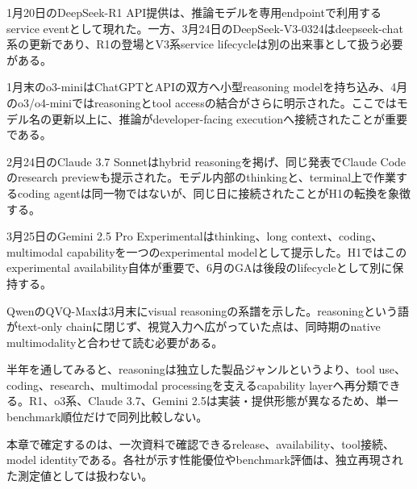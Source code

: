 
1月20日のDeepSeek-R1 API提供は、推論モデルを専用endpointで利用するservice eventとして現れた。一方、3月24日のDeepSeek-V3-0324はdeepseek-chat系の更新であり、R1の登場とV3系service lifecycleは別の出来事として扱う必要がある。\autocite{src-8f8555b73e1b}


1月末のo3-miniはChatGPTとAPIの双方へ小型reasoning modelを持ち込み、4月のo3/o4-miniではreasoningとtool accessの結合がさらに明示された。ここではモデル名の更新以上に、推論がdeveloper-facing executionへ接続されたことが重要である。\autocite{src-650b567698aa,src-bf92f3d905c3}


2月24日のClaude 3.7 Sonnetはhybrid reasoningを掲げ、同じ発表でClaude Codeのresearch previewも提示された。モデル内部のthinkingと、terminal上で作業するcoding agentは同一物ではないが、同じ日に接続されたことがH1の転換を象徴する。\autocite{src-a6c92f94a0af}


3月25日のGemini 2.5 Pro Experimentalはthinking、long context、coding、multimodal capabilityを一つのexperimental modelとして提示した。H1ではこのexperimental availability自体が重要で、6月のGAは後段のlifecycleとして別に保持する。\autocite{src-421ee9af3f80}


QwenのQVQ-Maxは3月末にvisual reasoningの系譜を示した。reasoningという語がtext-only chainに閉じず、視覚入力へ広がっていた点は、同時期のnative multimodalityと合わせて読む必要がある。\autocite{src-8cb736b33646}


半年を通してみると、reasoningは独立した製品ジャンルというより、tool use、coding、research、multimodal processingを支えるcapability layerへ再分類できる。R1、o3系、Claude 3.7、Gemini 2.5は実装・提供形態が異なるため、単一benchmark順位だけで同列比較しない。\autocite{src-421ee9af3f80,src-8f8555b73e1b,src-a6c92f94a0af,src-bf92f3d905c3}


\begin{claimboundary}
本章で確定するのは、一次資料で確認できるrelease、availability、tool接続、model identityである。各社が示す性能優位やbenchmark評価は、独立再現された測定値としては扱わない。
\end{claimboundary}
